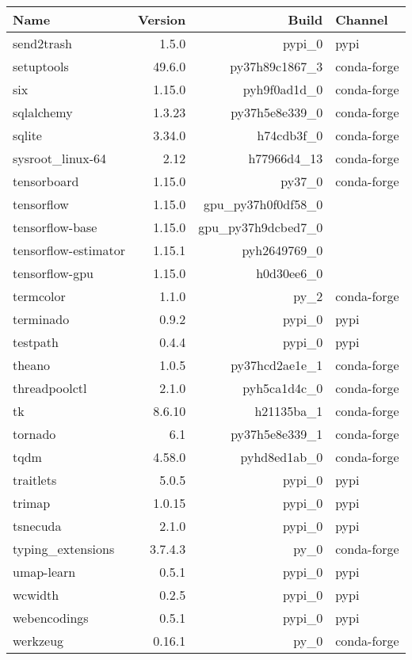 \begin{table}
	\begin{center}
		\begin{tabular}{|l|r|r|l|}
			\textbf{Name} &\textbf{Version} &\textbf{Build} &\textbf{Channel} \\
			\hline
			send2trash &1.5.0 & pypi\_0 &pypi \\
			setuptools &49.6.0 & py37h89c1867\_3 &conda-forge \\
			six &1.15.0 & pyh9f0ad1d\_0 &conda-forge \\
			sqlalchemy &1.3.23 & py37h5e8e339\_0 &conda-forge \\
			sqlite &3.34.0 & h74cdb3f\_0 &conda-forge \\
			sysroot\_linux-64 &2.12 & h77966d4\_13 &conda-forge \\
			tensorboard &1.15.0 & py37\_0 &conda-forge \\
			tensorflow &1.15.0 & gpu\_py37h0f0df58\_0 & \\
			tensorflow-base &1.15.0 & gpu\_py37h9dcbed7\_0 & \\
			tensorflow-estimator &1.15.1 & pyh2649769\_0 & \\
			tensorflow-gpu &1.15.0 & h0d30ee6\_0 & \\
			termcolor &1.1.0 & py\_2 &conda-forge \\
			terminado &0.9.2 & pypi\_0 &pypi \\
			testpath &0.4.4 & pypi\_0 &pypi \\
			theano &1.0.5 & py37hcd2ae1e\_1 &conda-forge \\
			threadpoolctl &2.1.0 & pyh5ca1d4c\_0 &conda-forge \\
			tk &8.6.10 & h21135ba\_1 &conda-forge \\
			tornado &6.1 & py37h5e8e339\_1 &conda-forge \\
			tqdm &4.58.0 & pyhd8ed1ab\_0 &conda-forge \\
			traitlets &5.0.5 & pypi\_0 &pypi \\
			trimap &1.0.15 & pypi\_0 &pypi \\
			tsnecuda &2.1.0 & pypi\_0 &pypi \\
			typing\_extensions &3.7.4.3 & py\_0 &conda-forge \\
			umap-learn &0.5.1 & pypi\_0 &pypi \\
			wcwidth &0.2.5 & pypi\_0 &pypi \\
			webencodings &0.5.1 & pypi\_0 &pypi \\
			werkzeug &0.16.1 & py\_0 &conda-forge \\

\end{tabular}
\end{center}
\end{table}
